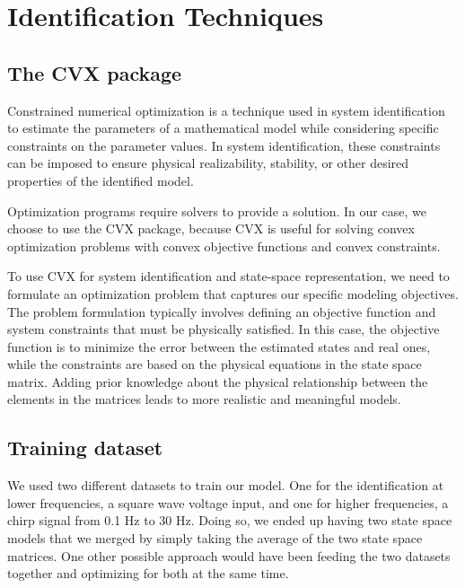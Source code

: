     \section{Identification Techniques}

        \subsection{The CVX package}
Constrained numerical optimization is a technique used in system identification to estimate the parameters of a mathematical model while considering specific constraints on the parameter values. In system identification, these constraints can be imposed to ensure physical realizability, stability, or other desired properties of the identified model.

Optimization programs require solvers to provide a solution. In our case, we choose to use the CVX package, because CVX is useful for solving convex optimization problems with convex objective functions and convex constraints. 

To use CVX for system identification and state-space representation, we need to formulate an optimization problem that captures our specific modeling objectives. The problem formulation typically involves defining an objective function and system constraints that must be physically satisfied. In this case, the objective function is to minimize the error between the estimated states and real ones, while the constraints are based on the physical equations in the state space matrix. Adding prior knowledge about the physical relationship between the elements in the matrices leads to more realistic and meaningful models.


        \subsection{Training dataset}

We used two different datasets to train our model. One for the identification at lower frequencies, a square wave voltage input,  and one for higher frequencies, a chirp signal from 0.1 Hz to 30 Hz. Doing so, we ended up having two state space models that we merged by simply taking the average of the two state space matrices. One other possible approach would have been feeding the two datasets together and optimizing for both at the same time.


